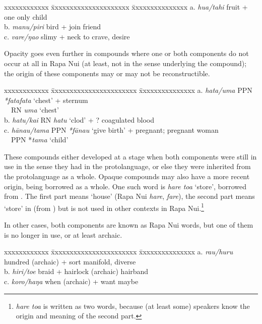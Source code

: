 \ea\label{ex:5.115}
\begin{tabbing}
xxxxxxxxxxxx \= xxxxxxxxxxxxxxxxxxxxx \= xxxxxxxxxxxxxxx  \kill
  a. \textit{hua/tahi} \>  fruit + one \>  only child\\
  b. \textit{manu/piri} \>  bird + join \>  friend\\
  c. \textit{vare/ŋao} \>  slimy + neck \>     to crave, desire
\end{tabbing}
\z

Opacity goes even further in compounds where one or both components do not occur at all in Rapa Nui (at least, not in the sense underlying the compound); the origin of these components may or may not be reconstructible. 

\ea\label{ex:5.116}
\begin{tabbing}
xxxxxxxxxxxx \= xxxxxxxxxxxxxxxxxxxxxxx \= xxxxxxxxxxxxxxx  \kill
  a. \textit{hata/uma} \> PPN \textit{*fatafata} ‘chest’ + \> sternum\\
\> ~~RN \textit{uma} ‘chest’  \\
  b. \textit{hatu/kai} \> RN \textit{hatu} ‘clod’ + ?  \> coagulated blood\\
  c. \textit{hānau/tama} \> PPN \textit{*fānau} ‘give birth’ + \> pregnant; pregnant woman\\
\> ~~PPN *\textit{tama} ‘child’ 
\end{tabbing}
\z

These compounds either developed at a stage when both components were still in use in the sense they had in the protolanguage, or else they were inherited from the protolanguage as a whole. Opaque compounds may also have a more recent origin, being borrowed as a whole. One such word is \textit{hare toa} ‘store’, borrowed from . The first part means ‘house’ (Rapa Nui \textit{hare},  \textit{fare}), the second part means ‘store’ in  (from ) but is not used in other contexts in Rapa Nui.\footnote{\label{fn:271}\textit{hare toa} is written as two words, because (at least some) speakers know the origin and meaning of the second part.}

In other cases, both components are known as Rapa Nui words, but one of them is no longer in use, or at least archaic. 

\ea\label{ex:5.117}
\begin{tabbing}
xxxxxxxxxxxx \= xxxxxxxxxxxxxxxxxxxxxxx \= xxxxxxxxxxxxxxx  \kill
  a. \textit{rau/huru} \>  hundred (archaic) + sort \>  manifold, diverse\\
  b. \textit{hiri/toe}  \> braid + hairlock (archaic) \>  hairband\\
  c. \textit{koro/haŋa} \>  when (archaic) + want \>  maybe
\end{tabbing}
\z

